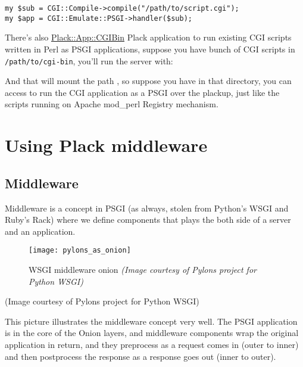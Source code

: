 \begin{lstlisting}
my $sub = CGI::Compile->compile("/path/to/script.cgi");
my $app = CGI::Emulate::PSGI->handler($sub);
\end{lstlisting}

There's also
\href{http://search.cpan.org/perldoc?Plack::App::CGIBin}{Plack::App::CGIBin}
Plack application to run existing CGI scripts written in Perl as PSGI
applications, suppose you have bunch of CGI scripts in
\lstinline!/path/to/cgi-bin!, you'll run the server with:


And that will mount the path , so suppose
you have  in that directory, you can access
 to run the CGI application as a PSGI over
the plackup, just like the scripts running on Apache mod\_perl Registry
mechanism.

\chapter{Using Plack
middleware}\label{day-10-using-plack-middleware}

\section{Middleware}\label{middleware}

Middleware is a concept in PSGI (as always, stolen from Python's WSGI
and Ruby's Rack) where we define components that plays the both side of
a server and an application.

\begin{figure}[htbp]
\centering
\texttt{[image: pylons\_as\_onion]}
\caption{WSGI middleware onion 
  \emph{(Image courtesy of Pylons project for Python WSGI)}}
\end{figure}

(Image courtesy of Pylons project for Python WSGI)

This picture illustrates the middleware concept very well. The PSGI
application is in the core of the Onion layers, and middleware
components wrap the original application in return, and they preprocess
as a request comes in (outer to inner) and then postprocess the response
as a response goes out (inner to outer).

